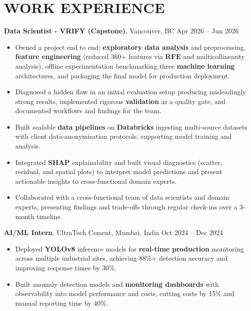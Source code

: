 \documentclass[10pt,a4paper]{article}
\begin{document}
\section*{WORK EXPERIENCE}

\textbf{Data Scientist - VRIFY (Capstone)}, Vancouver, BC \hfill \small{Apr 2026 -- Jun 2026}
\begin{itemize}[leftmargin=*, itemsep=1pt, topsep=1pt]
    \item Owned a project end to end: \textbf{exploratory data analysis} and preprocessing,
    \textbf{feature engineering} (reduced 360+ features via \textbf{RFE} and multicollinearity
    analysis), offline experimentation benchmarking three \textbf{machine learning} architectures,
    and packaging the final model for production deployment.
    \item Diagnosed a hidden flaw in an initial evaluation setup producing misleadingly strong
    results, implemented rigorous \textbf{validation} as a quality gate, and documented workflows
    and findings for the team.
    \item Built scalable \textbf{data pipelines} on \textbf{Databricks} ingesting multi-source
    datasets with client data-anonymisation protocols, supporting model training and analysis.
    \item Integrated \textbf{SHAP} explainability and built visual diagnostics (scatter, residual,
    and spatial plots) to interpret model predictions and present actionable insights to
    cross-functional domain experts.
    \item Collaborated with a cross-functional team of data scientists and domain experts,
    presenting findings and trade-offs through regular check-ins over a 3-month timeline.
\end{itemize}

\textbf{AI/ML Intern}, UltraTech Cement, Mumbai, India \hfill \small{Oct 2024 -- Dec 2024}
\begin{itemize}[leftmargin=*, itemsep=1pt, topsep=1pt]
    \item Deployed \textbf{YOLOv8} inference models for \textbf{real-time production}
    monitoring across multiple industrial sites, achieving 88\%+ detection accuracy and
    improving response times by 30\%.
    \item Built anomaly detection models and \textbf{monitoring dashboards} with observability
    into model performance and costs, cutting costs by 15\% and manual reporting time by 40\%.
\end{itemize}
\end{document}
